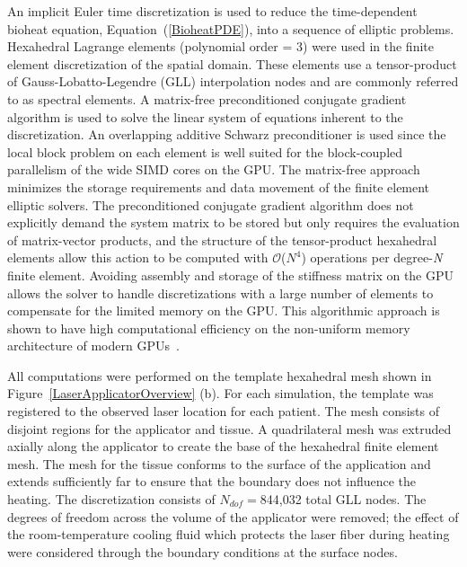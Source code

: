 \documentclass[12pt]{article}
\newcommand{\eqn}[1]{(\ref{#1})}
\begin{document}
An implicit Euler time discretization is used to reduce the 
time-dependent bioheat equation, Equation~\eqn{BioheatPDE}, into a sequence of elliptic problems. 
Hexahedral Lagrange elements (polynomial order = 3) were used in the finite
element discretization of the spatial domain.
These elements use a tensor-product of Gauss-Lobatto-Legendre (GLL) interpolation
nodes and are commonly referred to as spectral elements.  
A matrix-free preconditioned conjugate gradient algorithm is used to solve the
linear system of equations inherent to the discretization.  
An overlapping additive Schwarz preconditioner is used since the local
block problem on each element is well suited for the block-coupled
parallelism of the wide SIMD cores on the GPU.  
The matrix-free approach minimizes the storage
requirements and data movement of the finite element elliptic solvers.  The
preconditioned conjugate gradient algorithm does not explicitly demand the system
matrix to be stored but only requires the evaluation of matrix-vector products,
and the structure of the tensor-product hexahedral elements allow this action
to be computed with $\mathcal{O}$($N^4$) operations per degree-\textit{N} finite
element.  
Avoiding assembly and storage of the stiffness matrix on the GPU
allows the solver to handle discretizations with a large number of elements to
compensate for the limited memory on the GPU.  This algorithmic approach is
shown to have high computational efficiency on the non-uniform memory
architecture of modern GPUs~\cite{Medina2014}.

All computations were performed on the template hexahedral mesh
shown in Figure~\ref{LaserApplicatorOverview} (b).
For each simulation, the template was registered to the observed
laser location for each patient.
The mesh consists of disjoint regions for the applicator and tissue.
A quadrilateral mesh was extruded axially along the applicator to create
the base of the hexahedral finite element mesh. The mesh for the tissue
conforms to the surface of the application and extends sufficiently far
to ensure that the boundary does not influence the heating.
The discretization consists of $N_{dof}=$844,032 total GLL nodes. 
The degrees of freedom across the volume of the applicator were removed;
the effect of the room-temperature cooling fluid which protects the laser fiber
during heating were considered through the boundary conditions at the surface
nodes. 

\end{document}
